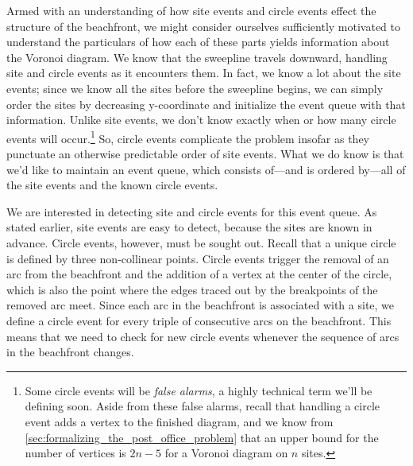 \documentclass[12pt,twoside]{reedthesis}
\begin{document}
      Armed with an understanding of how site events and circle events effect the structure of the beachfront, we might consider ourselves sufficiently motivated to understand the particulars of how each of these parts yields information about the Voronoi diagram. We know that the sweepline travels downward, handling site and circle events as it encounters them. In fact, we know a lot about the site events; since we know all the sites before the sweepline begins, we can simply order the sites by decreasing y-coordinate and initialize the event queue with that information. Unlike site events, we don't know exactly when or how many circle events will occur.\footnote{Some circle events will be \emph{false alarms}, a highly technical term we'll be defining soon. Aside from these false alarms, recall that handling a circle event adds a vertex to the finished diagram, and we know from \cref{sec:formalizing_the_post_office_problem} that an upper bound for the number of vertices is $2n-5$ for a Voronoi diagram on $n$ sites.} So, circle events complicate the problem insofar as they punctuate an otherwise predictable order of site events. What we do know is that we'd like to maintain an event queue, which consists of---and is ordered by---all of the site events and the known circle events. \par

      We are interested in detecting site and circle events for this event queue. As stated earlier, site events are easy to detect, because the sites are known in advance. Circle events, however, must be sought out. Recall that a unique circle is defined by three non-collinear points. Circle events trigger the removal of an arc from the beachfront and the addition of a vertex at the center of the circle, which is also the point where the edges traced out by the breakpoints of the removed arc meet. Since each arc in the beachfront is associated with a site, we define a circle event for every triple of consecutive arcs on the beachfront. This means that we need to check for new circle events whenever the sequence of arcs in the beachfront changes.\par
\end{document}
